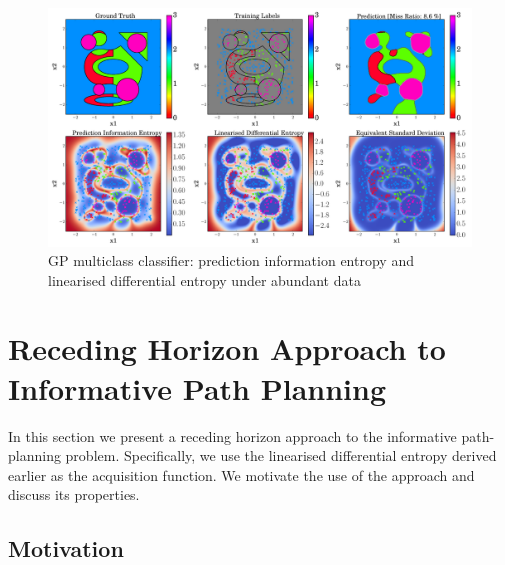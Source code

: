 \documentclass{article}
\begin{document}
		\begin{figure}[t]
		\centering
			\includegraphics[width = \linewidth]{Figures/multiclass-eps-converted-to.png}
		\caption{GP multiclass classifier: prediction information entropy and linearised differential entropy under abundant data}
		\label{Figure:Results:MulticlassLinearisedEntropy}
		\end{figure}
			
		
\section{Receding Horizon Approach to Informative Path Planning}
\label{Section:RecedingHorizonFormulation}

	In this section we present a receding horizon approach to the informative path-planning problem. Specifically, we use the linearised differential entropy derived earlier as the acquisition function. We motivate the use of the approach and discuss its properties.
	
	\subsection{Motivation}
	
\end{document}
